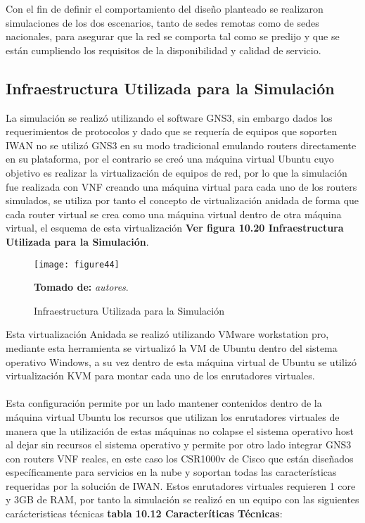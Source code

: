 Con el fin de definir el comportamiento del diseño planteado se realizaron simulaciones de los dos escenarios, tanto de sedes remotas como de sedes nacionales, para asegurar que la red se comporta tal como se predijo y que se están cumpliendo los requisitos de la disponibilidad y calidad de servicio.

\subsection{Infraestructura Utilizada para la Simulación} %
\label{sec:Infraestructura Utilizada para la Simulación}

La simulación se realizó utilizando el software GNS3, sin embargo dados los requerimientos de protocolos y dado que se requería de equipos que soporten IWAN no se utilizó GNS3 en su modo tradicional emulando routers directamente en su plataforma, por el contrario se creó una máquina virtual Ubuntu cuyo objetivo es realizar la virtualización de equipos de red, por lo que la simulación fue realizada con VNF creando una máquina virtual para cada uno de los routers simulados, se utiliza por tanto el concepto de virtualización anidada de forma que cada router virtual se crea como una máquina virtual dentro de otra máquina virtual, el esquema de esta virtualización \textbf{Ver figura 10.20 Infraestructura Utilizada para la Simulación}.
\begin{figure}[htbp]
  \centering
    {\texttt{[image: figure44]}}%
  \caption{\footnotesize{Infraestructura Utilizada para la Simulación}}
  \footnotesize{\textbf{Tomado de:} \textit{autores}.}
  \label{fig:fig2subfig}
\end{figure}
Esta virtualización Anidada se realizó utilizando VMware workstation pro, mediante esta herramienta se virtualizó la VM de Ubuntu dentro del sistema operativo Windows, a su vez dentro de esta máquina virtual de Ubuntu se utilizó virtualización KVM para montar cada uno de los enrutadores virtuales.
\\
\\
Esta configuración permite por un lado mantener contenidos dentro de la máquina virtual Ubuntu los recursos que utilizan los enrutadores virtuales de manera que la utilización de estas máquinas no colapse el sistema operativo host al dejar sin recursos el sistema operativo y permite por otro lado integrar GNS3 con routers VNF reales, en este caso los CSR1000v de Cisco que están diseñados específicamente para servicios en la nube y soportan todas las características requeridas por la solución de IWAN. Estos enrutadores virtuales requieren 1 core y 3GB de RAM, por tanto la simulación se realizó en un equipo con las siguientes carácteristicas técnicas \textbf{tabla 10.12 Caracteríticas Técnicas}:

